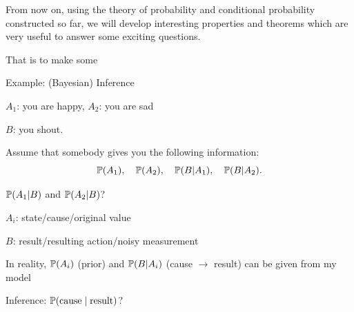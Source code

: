 \documentclass[fleqn,aspectratio=169]{beamer}
\begin{document}
\begin{frame}{}
\vspace{2cm}
\LARGE From now on, using the theory of probability and conditional probability constructed so far, we will develop interesting properties and theorems which are very useful to answer some exciting questions. 

\medskip

\LARGE That is  to make some 

\end{frame}

\begin{frame}{Example: (Bayesian) Inference}

{
\plitemsep 0.1in
\bci 

\item<2-> $A_1$: you are happy, $A_2$: you are sad
\item<2-> $B$: you shout. 

\item<4-> Assume that somebody gives you the following information:
$$
\mathbb{P}( A_1 ), \quad \mathbb{P}( A_2 ), \quad \mathbb{P}( B | A_1 ), \quad\mathbb{P}( B | A_2 ).
$$

\item<6->  $\mathbb{P}( A_1 | B )$ and $\mathbb{P}( A_2 | B )$?
\eci 
}
{
\plitemsep 0.1in
\bci 

\item<3-> $A_i$: state/cause/original value
\item<3-> $B$: result/resulting action/noisy measurement

\item<5-> In reality, $\mathbb{P}( A_i )$ (prior) and $\mathbb{P}( B | A_i )$ (cause $\rightarrow$ result) can be given from my model

\item<7-> Inference: $\mathbb{P}( \text{cause} \mid \text{result} )$?

\eci 
}

\medskip


\end{frame}
\end{document}
